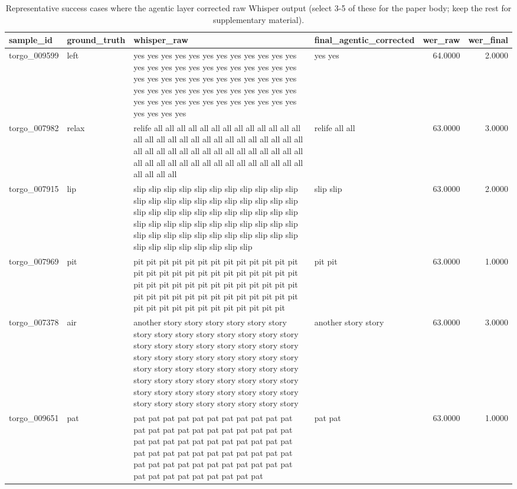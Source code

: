 \begin{table}
\caption{Representative success cases where the agentic layer corrected raw Whisper output (select 3-5 of these for the paper body; keep the rest for supplementary material).}
\label{tab:table_6_qualitative_examples}
\begin{tabular}{llllrr}
\toprule
sample_id & ground_truth & whisper_raw & final_agentic_corrected & wer_raw & wer_final \\
\midrule
torgo_009599 & left & yes yes yes yes yes yes yes yes yes yes yes yes yes yes yes yes yes yes yes yes yes yes yes yes yes yes yes yes yes yes yes yes yes yes yes yes yes yes yes yes yes yes yes yes yes yes yes yes yes yes yes yes yes yes yes yes yes yes yes yes yes yes yes yes & yes yes & 64.0000 & 2.0000 \\
torgo_007982 & relax & relife all all all all all all all all all all all all all all all all all all all all all all all all all all all all all all all all all all all all all all all all all all all all all all all all all all all all all all all all all all all all all all & relife all all & 63.0000 & 3.0000 \\
torgo_007915 & lip & slip slip slip slip slip slip slip slip slip slip slip slip slip slip slip slip slip slip slip slip slip slip slip slip slip slip slip slip slip slip slip slip slip slip slip slip slip slip slip slip slip slip slip slip slip slip slip slip slip slip slip slip slip slip slip slip slip slip slip slip slip slip slip & slip slip & 63.0000 & 2.0000 \\
torgo_007969 & pit & pit pit pit pit pit pit pit pit pit pit pit pit pit pit pit pit pit pit pit pit pit pit pit pit pit pit pit pit pit pit pit pit pit pit pit pit pit pit pit pit pit pit pit pit pit pit pit pit pit pit pit pit pit pit pit pit pit pit pit pit pit pit pit pit & pit pit & 63.0000 & 1.0000 \\
torgo_007378 & air & another story story story story story story story story story story story story story story story story story story story story story story story story story story story story story story story story story story story story story story story story story story story story story story story story story story story story story story story story story story story story story story & another story story & 63.0000 & 3.0000 \\
torgo_009651 & pat & pat pat pat pat pat pat pat pat pat pat pat pat pat pat pat pat pat pat pat pat pat pat pat pat pat pat pat pat pat pat pat pat pat pat pat pat pat pat pat pat pat pat pat pat pat pat pat pat pat pat pat pat pat pat pat pat pat pat pat pat pat pat pat pat & pat pat & 63.0000 & 1.0000 \\

\end{tabular}
\end{table}
